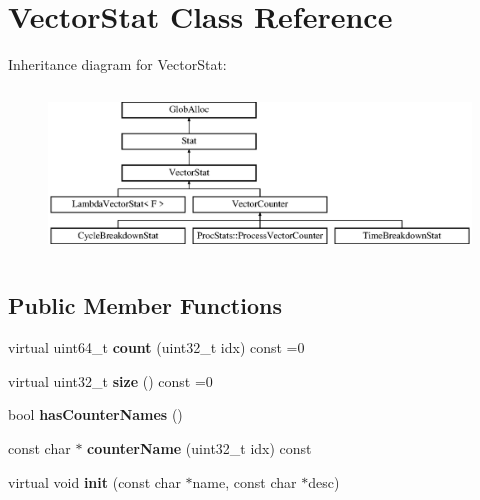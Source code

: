 \hypertarget{classVectorStat}{\section{Vector\-Stat Class Reference}
\label{classVectorStat}
}
Inheritance diagram for Vector\-Stat\-:\begin{figure}[H]
\begin{center}
\leavevmode
\includegraphics[height=4.465710cm]{classVectorStat}
\end{center}
\end{figure}
\subsection*{Public Member Functions}
\begin{DoxyCompactItemize}
\item 
\hypertarget{classVectorStat_ae1a1af87b8ace368f942bb696d0b66f3}{virtual uint64\-\_\-t {\bfseries count} (uint32\-\_\-t idx) const =0}\label{classVectorStat_ae1a1af87b8ace368f942bb696d0b66f3}

\item 
\hypertarget{classVectorStat_a507888e5f767a333fd8e0ed124bd2805}{virtual uint32\-\_\-t {\bfseries size} () const =0}\label{classVectorStat_a507888e5f767a333fd8e0ed124bd2805}

\item 
\hypertarget{classVectorStat_a8ac8964feb39c3812e95081f90f7254c}{bool {\bfseries has\-Counter\-Names} ()}\label{classVectorStat_a8ac8964feb39c3812e95081f90f7254c}

\item 
\hypertarget{classVectorStat_abd0dcde7ab45ec09010f8b22655f54f8}{const char $\ast$ {\bfseries counter\-Name} (uint32\-\_\-t idx) const }\label{classVectorStat_abd0dcde7ab45ec09010f8b22655f54f8}

\item 
\hypertarget{classVectorStat_a2987ee17f0f91ef3bf4182bf304fa6f8}{virtual void {\bfseries init} (const char $\ast$name, const char $\ast$desc)}\label{classVectorStat_a2987ee17f0f91ef3bf4182bf304fa6f8}

\end{DoxyCompactItemize}
